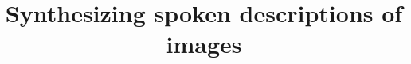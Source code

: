 \documentclass[journal,comsoc]{IEEEtran}
\begin{document}
%
\title{Synthesizing spoken descriptions of images}
%
%
%


        
\end{document}
